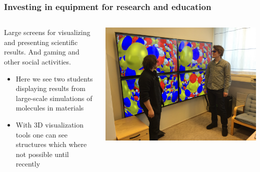 \documentclass{beamer}
\begin{document}
\begin{frame}
\frametitle{Investing in equipment for research and education}

\begin{columns}
\begin{block}{}
Large screens for visualizing and presenting scientific results. And gaming and other social activities. 
\begin{itemize}
\item Here we see two students displaying results from large-scale simulations of molecules in materials

\item With 3D visualization tools one can see structures which where not possible until recently
\end{itemize}

\noindent
\end{block}

\centerline{\includegraphics[width=1.0\linewidth]{fig-future/visualize.jpg}}



\end{columns}
\end{frame}
\end{document}
